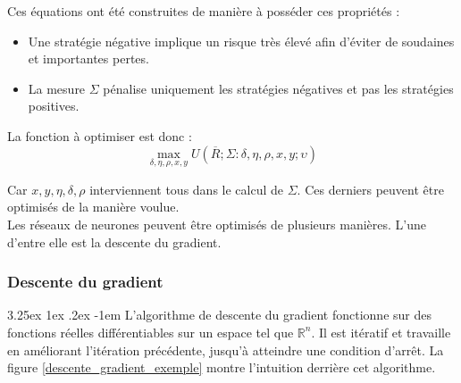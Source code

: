 \documentclass[a4paper, 11pt]{article}
\makeatletter
\renewcommand\paragraph{\@startsection{paragraph}{5}{\z@}%
  {3.25ex \@plus1ex \@minus.2ex}%
  {-1em}%
  {\normalfont\normalsize\bfseries}}
\makeatother
\begin{document}
Ces équations ont été construites de manière à posséder ces propriétés \cite{fx_trading}:
\begin{itemize}
 \item Une stratégie négative implique un risque très élevé afin d'éviter de soudaines et importantes pertes.
 
 \item La mesure $\Sigma$ pénalise uniquement les stratégies négatives et pas les stratégies positives. 
\end{itemize}

La fonction à optimiser est donc :
$$\max_{\delta, \eta, \rho, x, y} U(\overline{R};\Sigma: \delta, \eta, \rho, x, y; \upsilon)$$

Car $x,y,\eta,\delta,\rho$ interviennent tous dans le calcul de $\Sigma$. Ces derniers peuvent être optimisés de la manière voulue.
\\
Les réseaux de neurones peuvent être optimisés de plusieurs manières. L'une d'entre elle est la descente du gradient.


\subsubsection{Descente du gradient}\label{section descente du gradient}
\paragraph{}
L'algorithme de descente du gradient fonctionne sur des fonctions réelles différentiables sur un espace tel
que $\mathbb{R}^n$. Il est itératif et travaille en améliorant l'itération précédente, jusqu'à
atteindre une condition d'arrêt. La figure \ref{descente_gradient_exemple} montre l'intuition derrière cet algorithme.
\end{document}

